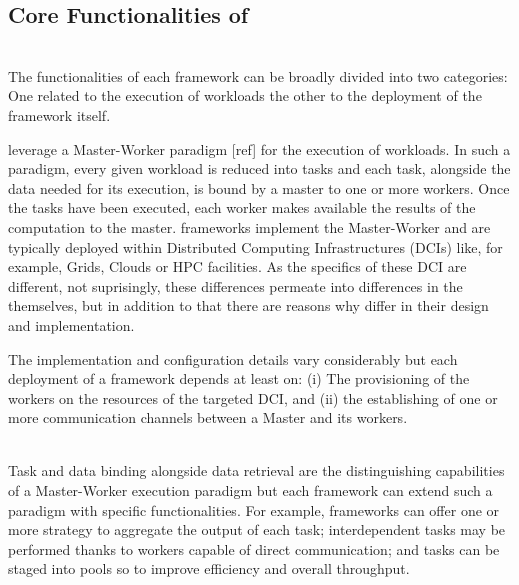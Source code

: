 \documentclass{sig-alternate}
\begin{document}
\subsection{Core Functionalities of \pilotjobs}

\\ The functionalities of each \pilotjob
framework can be broadly divided into two categories: One related to the
execution of workloads the other to the deployment of the framework
itself.  



\pilotjobs leverage a Master-Worker paradigm [ref] for the execution
of workloads. In such a paradigm, every given workload is reduced into
tasks and each task, alongside the data needed for its execution, is
bound by a master to one or more workers. Once the tasks have been
executed, each worker makes available the results of the computation
to the master. \pilotjob frameworks implement the Master-Worker
 and are typically deployed within Distributed Computing
Infrastructures (DCIs) like, for example, Grids, Clouds or HPC
facilities. As the specifics of these DCI are different, not
suprisingly, these differences permeate into differences in the
\pilotjobs themselves, but in addition to that there are reasons why
\pilotjobs differ in their design and implementation.

The implementation and configuration details vary considerably but
each deployment of a \pilotjob framework depends at least on: (i) The
provisioning of the workers on the resources of the targeted DCI, and
(ii) the establishing of one or more communication channels between a
Master and its workers.

\\
Task and data binding alongside data retrieval are the distinguishing
capabilities of a Master-Worker execution paradigm but each \pilotjob
framework can extend such a paradigm with specific
functionalities. For example, \pilotjob frameworks can offer one or
more strategy to aggregate the output of each task; interdependent
tasks may be performed thanks to workers capable of direct
communication; and tasks can be staged into pools so to improve
efficiency and overall throughput.
\end{document}

